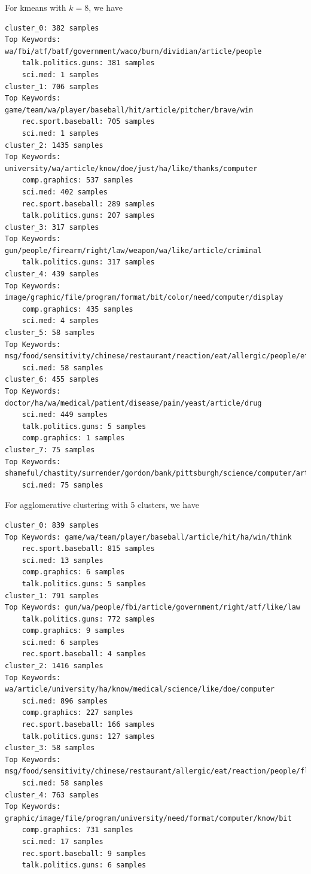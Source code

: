 \documentclass{article}
\begin{document}
    For kmeans with $k=8$, we have
    \begin{Verbatim}
cluster_0: 382 samples
Top Keywords: wa/fbi/atf/batf/government/waco/burn/dividian/article/people
	talk.politics.guns: 381 samples
	sci.med: 1 samples
cluster_1: 706 samples
Top Keywords: game/team/wa/player/baseball/hit/article/pitcher/brave/win
	rec.sport.baseball: 705 samples
	sci.med: 1 samples
cluster_2: 1435 samples
Top Keywords: university/wa/article/know/doe/just/ha/like/thanks/computer
	comp.graphics: 537 samples
	sci.med: 402 samples
	rec.sport.baseball: 289 samples
	talk.politics.guns: 207 samples
cluster_3: 317 samples
Top Keywords: gun/people/firearm/right/law/weapon/wa/like/article/criminal
	talk.politics.guns: 317 samples
cluster_4: 439 samples
Top Keywords: image/graphic/file/program/format/bit/color/need/computer/display
	comp.graphics: 435 samples
	sci.med: 4 samples
cluster_5: 58 samples
Top Keywords: msg/food/sensitivity/chinese/restaurant/reaction/eat/allergic/people/effect
	sci.med: 58 samples
cluster_6: 455 samples
Top Keywords: doctor/ha/wa/medical/patient/disease/pain/yeast/article/drug
	sci.med: 449 samples
	talk.politics.guns: 5 samples
	comp.graphics: 1 samples
cluster_7: 75 samples
Top Keywords: shameful/chastity/surrender/gordon/bank/pittsburgh/science/computer/article/lyme
	sci.med: 75 samples

    \end{Verbatim}


    For agglomerative clustering with 5 clusters, we have
    \begin{Verbatim}
cluster_0: 839 samples
Top Keywords: game/wa/team/player/baseball/article/hit/ha/win/think
	rec.sport.baseball: 815 samples
	sci.med: 13 samples
	comp.graphics: 6 samples
	talk.politics.guns: 5 samples
cluster_1: 791 samples
Top Keywords: gun/wa/people/fbi/article/government/right/atf/like/law
	talk.politics.guns: 772 samples
	comp.graphics: 9 samples
	sci.med: 6 samples
	rec.sport.baseball: 4 samples
cluster_2: 1416 samples
Top Keywords: wa/article/university/ha/know/medical/science/like/doe/computer
	sci.med: 896 samples
	comp.graphics: 227 samples
	rec.sport.baseball: 166 samples
	talk.politics.guns: 127 samples
cluster_3: 58 samples
Top Keywords: msg/food/sensitivity/chinese/restaurant/allergic/eat/reaction/people/flavor
	sci.med: 58 samples
cluster_4: 763 samples
Top Keywords: graphic/image/file/program/university/need/format/computer/know/bit
	comp.graphics: 731 samples
	sci.med: 17 samples
	rec.sport.baseball: 9 samples
	talk.politics.guns: 6 samples
    \end{Verbatim}
\end{document}
